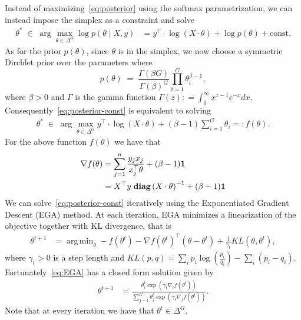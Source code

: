 \documentclass[11pt]{article}
\newcommand{\diag}[1]{\mathbf{diag}\left( #1\right)}
\newcommand{\ones}{{\bf 1}}
\DeclareMathOperator*{\argmin}{arg\,min}
\begin{document}
Instead of maximizing~\eqref{eq:posterior} using the softmax parametrization, we can instead impose the simplex as a constraint and solve
\begin{align}
\theta^* \; \in \; \arg \max_{\theta \in \Delta^G}  \log p(\theta \mid X, y) &= y^{\top} \cdot \log \left( X \cdot \theta \right)
         +\log p(\theta)+\textrm{const.} \label{eq:posterior-const}
\end{align} 
As for the prior $p(\theta)$, since $\theta$ is in the simplex, we now choose a symmetric Dirchlet  prior over the parameters where
\begin{equation}
p(\theta) \; = \; \frac{\Gamma(\beta G)}{\Gamma(\beta)^G} \prod_{i=1}^G \theta_i^{\beta -1}, 
\end{equation}
where $\beta>0$ and $\Gamma$ is the gamma function $\Gamma(z) : = \int_{0}^{\infty} x^{z-1}e^{-x}dx.$
Consequently~\eqref{eq:posterior-const} is equivalent to solving
 \begin{align}
\theta^* \; \in \; \arg \max_{\theta \in \Delta^G}   y^{\top} \cdot \log \left( X \cdot \theta \right)
         +(\beta-1)\sum_{i=1}^G\theta_i =: f(\theta). \label{eq:posterior-const}
\end{align} 
For the above function $f(\theta)$ we have that
\begin{align}
\nabla f(\theta) &= \sum_{j=1}^n \frac{y_j x_j}{x_j^\top \theta} + (\beta-1 ) \ones\\
&= X^\top y \;\diag{X  \cdot\theta}^{-1}+ (\beta-1 ) \ones
\end{align}
We can solve~\eqref{eq:posterior-const} iteratively using the Exponentiated Gradient Descent (EGA) method. At each iteration, EGA minimizes a linearization of the objective together with KL divergence, that is
\begin{align}\label{eq:EGA}
\theta^{t+1} & = \argmin_{\theta} -f(\theta^t) - \nabla f(\theta^t)^\top(\theta -\theta^t) + \frac{1}{\gamma_t} KL(\theta,\theta^t),
\end{align}
where $\gamma_t >0$ is a step length and $ KL(p,q) = \sum_i p_i \log\left(\frac{p_i}{q_i} \right)- \sum_i(p_i-q_i)$. Fortunately~\eqref{eq:EGA} has a closed form solution given by
\begin{align}\label{eq:EGAupdate}
\theta^{t+1} &=  \frac{\theta^t_i \exp( \gamma_t  \nabla_{i}f(\theta^t) )}{\sum_{j=1}^G\theta^t_j \exp( \gamma_t  \nabla_{j}f(\theta^t) ) }.
\end{align}
Note that at every iteration we have that $\theta^t \in \Delta^G.$
\end{document}
